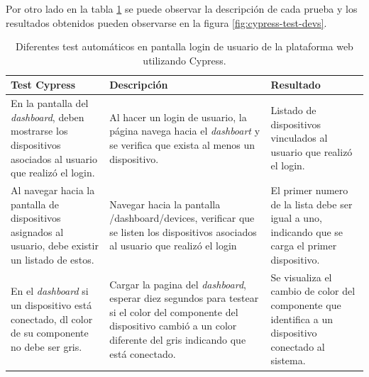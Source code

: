 Por otro lado en la tabla \ref{tab:test-cypress-devs} se puede observar la descripción de cada prueba y los resultados obtenidos pueden observarse en la figura \ref{fig:cypress-test-devs}. 
\pagebreak
\begin{table}[h]
	\centering
	\caption[Test de login utilizando Cypress]{Diferentes test automáticos en pantalla login de usuario de la plataforma web utilizando Cypress.}
	\begin{tabular}{p{4cm} p{4cm} p{4cm}}    
		\toprule
		\textbf{Test Cypress }  		& \textbf{Descripción}	& \textbf{Resultado}\\
		\midrule
	
		En la pantalla del \textit{dashboard}, deben mostrarse los dispositivos asociados al usuario que realizó el login.			& Al hacer un login de usuario, la página navega hacia el \textit{dashboart} y se verifica que exista al menos un dispositivo.				& Listado de dispositivos vinculados al usuario que realizó el login.\\	
		
		Al navegar hacia la pantalla de dispositivos asignados al usuario, debe existir un listado de estos. 	 			& Navegar hacia la pantalla /dashboard/devices, verificar que se listen los dispositivos asociados al usuario que realizó el login 				& El primer numero de la lista debe ser igual a uno, indicando que se carga el primer dispositivo.\\	
		
		En el \textit{dashboard} si un dispositivo está conectado, dl color de su componente no debe ser gris.   & Cargar la pagina del \textit{dashboard}, esperar diez segundos para testear si el color del componente del dispositivo cambió a un color diferente del gris indicando que está conectado.		& Se visualiza el cambio de color del componente que identifica a un dispositivo conectado al sistema. \\
		
		
		\bottomrule
		\hline
	\end{tabular}
\label{tab:test-cypress-devs}
\end{table}




